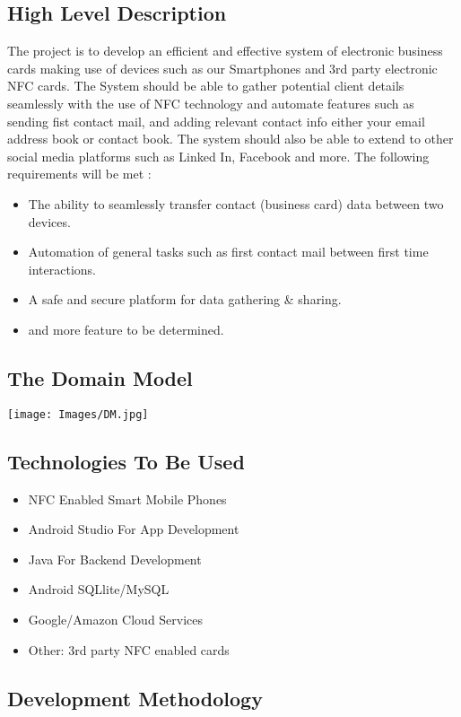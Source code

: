 \documentclass[11pt]{article}
\begin{document}
\subsection{High Level Description}
The project is to develop an efficient and effective system of electronic business cards making use of devices such as our Smartphones and 3rd party electronic NFC cards. The System should be able to gather potential client details seamlessly with the use of NFC technology and automate features such as sending fist contact mail, and adding relevant contact info either your email address book or contact book. The system should also be able to extend to other social media platforms such as Linked In, Facebook and more.
\newline
\newline The following requirements will be met : 
\begin{itemize}
\item The ability to seamlessly transfer contact (business card) data  between two devices.
\item Automation of general tasks such as first contact mail between first time interactions.
\item A safe and secure platform for data gathering \& sharing.
\item and more feature to be determined.
\end{itemize}

\subsection{The Domain Model}
\texttt{[image: Images/DM.jpg]}
           

\subsection{Technologies To Be Used}
\begin{itemize}
\item NFC Enabled Smart Mobile Phones
\item Android Studio For App Development
\item Java For Backend Development
\item Android SQLlite/MySQL
\item Google/Amazon Cloud Services
\item Other: 3rd party NFC enabled cards 
\end{itemize}
\subsection{Development Methodology}
\end{document}
